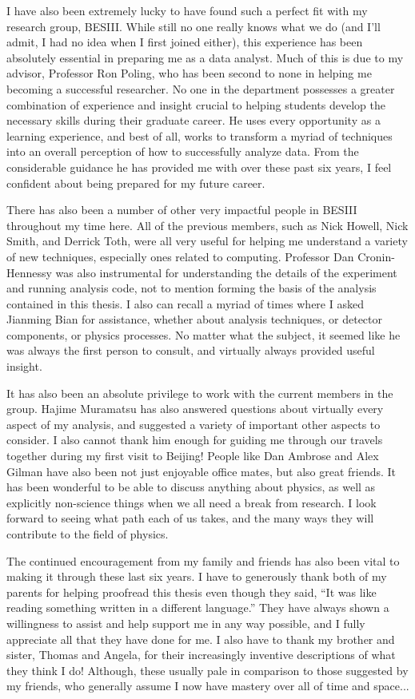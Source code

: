 I have also been extremely lucky to have found such a perfect fit with my research group, BESIII.
While still no one really knows what we do (and I'll admit, I had no idea when I first joined either), this experience has been absolutely essential in preparing me as a data analyst.
Much of this is due to my advisor, Professor Ron Poling, who has been second to none in helping me becoming a successful researcher.
No one in the department possesses a greater combination of experience and insight crucial to helping students develop the necessary skills during their graduate career.
He uses every opportunity as a learning experience, and best of all, works to transform a myriad of techniques into an overall perception of how to successfully analyze data.
From the considerable guidance he has provided me with over these past six years, I feel confident about being prepared for my future career.

There has also been a number of other very impactful people in BESIII throughout my time here.
All of the previous members, such as Nick Howell, Nick Smith, and Derrick Toth, were all very useful for helping me understand a variety of new techniques, especially ones related to computing.
Professor Dan Cronin-Hennessy was also instrumental for understanding the details of the experiment and running analysis code, not to mention forming the basis of the analysis contained in this thesis.
I also can recall a myriad of times where I asked Jianming Bian for assistance, whether about analysis techniques, or detector components, or physics processes.
No matter what the subject, it seemed like he was always the first person to consult, and virtually always provided useful insight.

It has also been an absolute privilege to work with the current members in the group.
Hajime Muramatsu has also answered questions about virtually every aspect of my analysis, and suggested a variety of important other aspects to consider.
I also cannot thank him enough for guiding me through our travels together during my first visit to Beijing!
People like Dan Ambrose and Alex Gilman have also been not just enjoyable office mates, but also great friends.
It has been wonderful to be able to discuss anything about physics, as well as explicitly non-science things when we all need a break from research.
I look forward to seeing what path each of us takes, and the many ways they will contribute to the field of physics.

The continued encouragement from my family and friends has also been vital to making it through these last six years.
I have to generously thank both of my parents for helping proofread this thesis even though they said, ``It was like reading something written in a different language.''
They have always shown a willingness to assist and help support me in any way possible, and I fully appreciate all that they have done for me.
I also have to thank my brother and sister, Thomas and Angela, for their increasingly inventive descriptions of what they think I do!
Although, these usually pale in comparison to those suggested by my friends, who generally assume I now have mastery over all of time and space...

